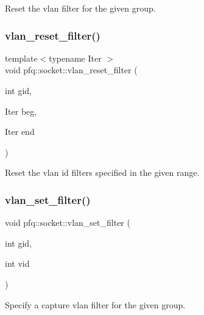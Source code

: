 Reset the vlan filter for the given group. 

\mbox{\label{classpfq_1_1socket_a18efa89248a6d6bfb29d575744d21608}} 
\subsubsection{\texorpdfstring{vlan\+\_\+reset\+\_\+filter()}{vlan\_reset\_filter()}\hspace{0.1cm}{\footnotesize\ttfamily [2/2]}}
{\footnotesize\ttfamily template$<$typename Iter $>$ \\
void pfq\+::socket\+::vlan\+\_\+reset\+\_\+filter (\begin{DoxyParamCaption}\item[{int}]{gid,  }\item[{Iter}]{beg,  }\item[{Iter}]{end }\end{DoxyParamCaption})\hspace{0.3cm}{\ttfamily [inline]}}



Reset the vlan id filters specified in the given range. 

\mbox{\label{classpfq_1_1socket_a92eeaf78ff595546c517b5699c9a5b1e}} 
\subsubsection{\texorpdfstring{vlan\+\_\+set\+\_\+filter()}{vlan\_set\_filter()}\hspace{0.1cm}{\footnotesize\ttfamily [1/2]}}
{\footnotesize\ttfamily void pfq\+::socket\+::vlan\+\_\+set\+\_\+filter (\begin{DoxyParamCaption}\item[{int}]{gid,  }\item[{int}]{vid }\end{DoxyParamCaption})\hspace{0.3cm}{\ttfamily [inline]}}



Specify a capture vlan filter for the given group. 

